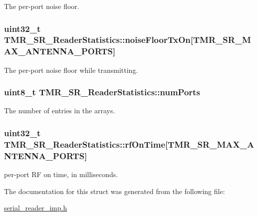 The per-port noise floor. \hypertarget{struct_t_m_r___s_r___reader_statistics_27a2b6415c327b52ce2c8628fe1a8632}{
\subsubsection[{noiseFloorTxOn}]{\setlength{\rightskip}{0pt plus 5cm}uint32\_\-t {\bf TMR\_\-SR\_\-ReaderStatistics::noiseFloorTxOn}\mbox{[}TMR\_\-SR\_\-MAX\_\-ANTENNA\_\-PORTS\mbox{]}}}
\label{struct_t_m_r___s_r___reader_statistics_27a2b6415c327b52ce2c8628fe1a8632}


The per-port noise floor while transmitting. \hypertarget{struct_t_m_r___s_r___reader_statistics_22c448dde1976203d18eb8763d8d45a8}{
\subsubsection[{numPorts}]{\setlength{\rightskip}{0pt plus 5cm}uint8\_\-t {\bf TMR\_\-SR\_\-ReaderStatistics::numPorts}}}
\label{struct_t_m_r___s_r___reader_statistics_22c448dde1976203d18eb8763d8d45a8}


The number of entries in the arrays. \hypertarget{struct_t_m_r___s_r___reader_statistics_2e98e3d9c3824e31751cd0557b8cf00f}{
\subsubsection[{rfOnTime}]{\setlength{\rightskip}{0pt plus 5cm}uint32\_\-t {\bf TMR\_\-SR\_\-ReaderStatistics::rfOnTime}\mbox{[}TMR\_\-SR\_\-MAX\_\-ANTENNA\_\-PORTS\mbox{]}}}
\label{struct_t_m_r___s_r___reader_statistics_2e98e3d9c3824e31751cd0557b8cf00f}


per-port RF on time, in milliseconds. 

The documentation for this struct was generated from the following file:\begin{CompactItemize}
\item 
\hyperlink{serial__reader__imp_8h}{serial\_\-reader\_\-imp.h}\end{CompactItemize}
